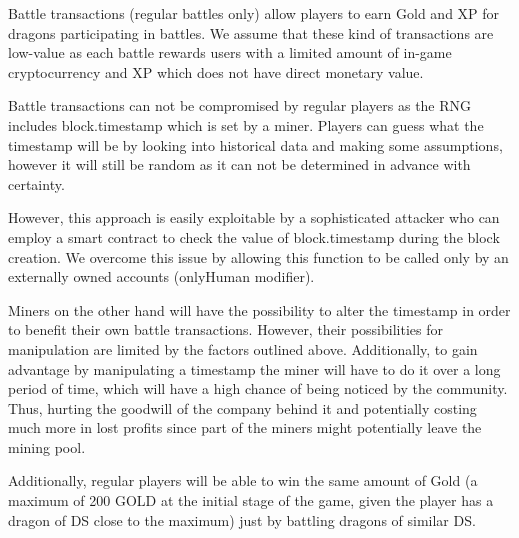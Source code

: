 \documentclass[12pt]{article}
\begin{document}
\begin{justify}
Battle transactions (regular battles only) allow players to earn Gold and XP for dragons participating in battles. We assume that these kind of transactions are low-value as each battle rewards users with a limited amount of in-game cryptocurrency and XP which does not have direct monetary value.
\end{justify}\par

\begin{justify}
Battle transactions can not be compromised by regular players as the RNG includes block.timestamp which is set by a miner. Players can guess what the timestamp will be by looking into historical data and making some assumptions, however it will still be random as it can not be determined in advance with certainty.
\end{justify}\par

\begin{justify}
However, this approach is easily exploitable by a sophisticated attacker who can employ a smart contract to check the value of block.timestamp during the block creation. We overcome this issue by allowing this function to be called only by an externally owned accounts  \cite{account_types_gas_and_transactions} (onlyHuman modifier).
\end{justify}\par

\begin{justify}
Miners on the other hand will have the possibility to alter the timestamp in order to benefit their own battle transactions. However, their possibilities for manipulation are limited by the factors outlined above. Additionally, to gain advantage by manipulating a timestamp the miner will have to do it over a long period of time, which will have a high chance of being noticed by the community. Thus, hurting the goodwill of the company behind it and potentially costing much more in lost profits since part of the miners might potentially leave the mining pool.
\end{justify}\par

\begin{justify}
Additionally, regular players will be able to win the same amount of Gold (a maximum of 200 GOLD at the initial stage of the game, given the player has a dragon of DS close to the maximum) just by battling dragons of similar DS.
\end{justify}\par
\end{document}

